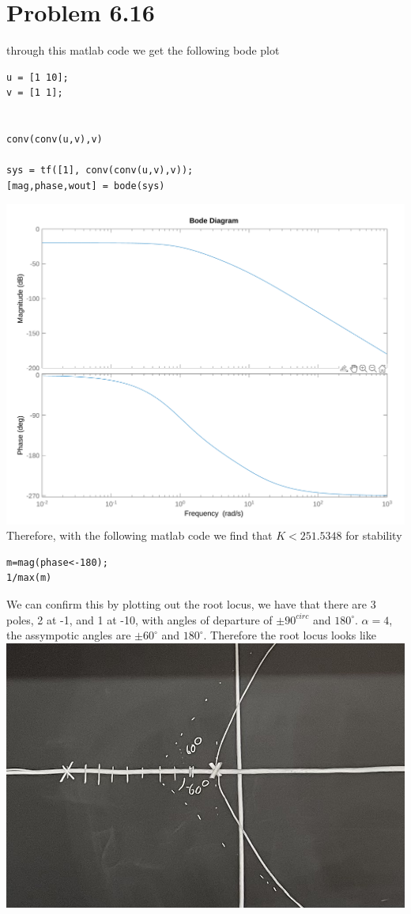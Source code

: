 \documentclass[12pt]{article}
\begin{document}
\section*{Problem 6.16}
through this matlab code we get the following bode plot
\begin{verbatim}
u = [1 10];
v = [1 1];


conv(conv(u,v),v)

sys = tf([1], conv(conv(u,v),v));
[mag,phase,wout] = bode(sys)
\end{verbatim}
\includegraphics[scale=0.2]{Problem3Fig1.png}\\
Therefore, with the following matlab code we find that $K<251.5348$ for stability
\begin{verbatim}
m=mag(phase<-180);
1/max(m)
\end{verbatim}
We can confirm this by plotting out the root locus, we have that there are 3 poles, 2 at -1, and 1 at -10, with angles of departure of $\pm90^{circ}$ and $180^{\circ}$.
 $\alpha=4$, the assympotic angles are $\pm60^{\circ}$ and $180^{\circ}$.
 Therefore the root locus looks like\\
\includegraphics[scale=0.4]{Problem3Fig2.jpg}\\
\end{document}
